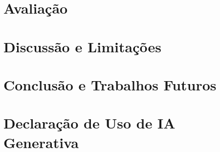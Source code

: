 \documentclass[12pt]{article}
\begin{document}
\section{Avaliação}
\label{sec:avaliacao}


\section{Discussão e Limitações}
\label{sec:discussao}


\section{Conclusão e Trabalhos Futuros}
\label{sec:conclusao}


\section*{Declaração de Uso de IA Generativa}
\label{sec:declaracao-ia}





%

\end{document}
